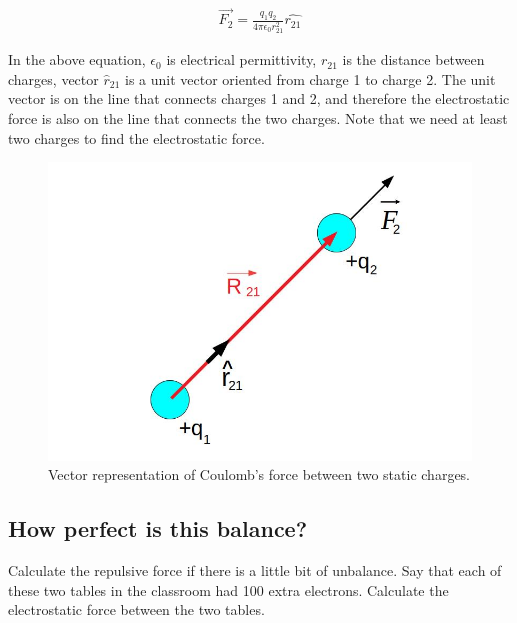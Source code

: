 \documentclass{ximera}
\begin{document}
\begin{eqnarray}
\vec{F_2}=\frac{q_1 q_2}{4 \pi \epsilon_0 r_{21}^2} \hat{r_{21}}
\end{eqnarray}\label{Coulombslaw}

In the above equation, $\epsilon_0$ is electrical permittivity, $r_{21}$ is the distance between charges, vector $\hat{r}_{21}$ is a unit vector oriented from charge 1 to charge 2. The unit vector is on the line that connects charges 1 and 2, and therefore the electrostatic force is also on the line that connects the two charges. Note that we need at least two charges to find the electrostatic force.


\begin{figure}[htbp]
\begin{center}
\includegraphics[scale=0.5]{../jpg/Two_Static_ChargesV1.jpg}
\end{center}
\caption{Vector representation of Coulomb's force between two static charges.}
\label{twostaticch}
\end{figure}


\subsection{How perfect is this balance?}




Calculate the repulsive force if there is a little bit of unbalance. Say that each of these two tables in the classroom had 100 extra electrons. Calculate the electrostatic force between the two tables. 
\end{document}
